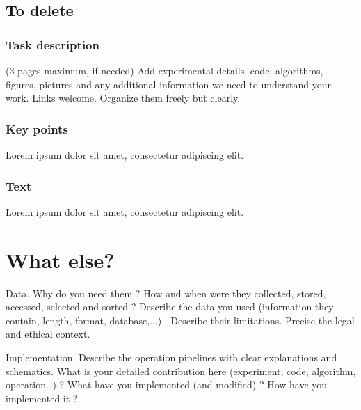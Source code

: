 \documentclass[11pt,a4paper]{article}
\begin{document}
\subsection{To delete}

\subsubsection{Task description}

(3 pages maximum, if needed)
Add experimental details, code, algorithms, figures, pictures and any 
additional information we need to understand your work. Links welcome.
Organize them freely but clearly.

\subsubsection{Key points}

Lorem ipsum dolor sit amet, consectetur adipiscing elit.

\subsubsection{Text}

Lorem ipsum dolor sit amet, consectetur adipiscing elit.

\section{What else?}

Data. 
Why do you need them ? How and when were they collected, stored, accessed, selected and sorted ? Describe the data you used (information they contain, length, format, database,...) . Describe their limitations. Precise the legal and ethical context.

Implementation. 
Describe the operation pipelines with clear explanations and schematics. What is your detailed contribution here (experiment, code, algorithm, operation…) ? What have you implemented (and modified) ? How have you implemented it ? 
\end{document}
